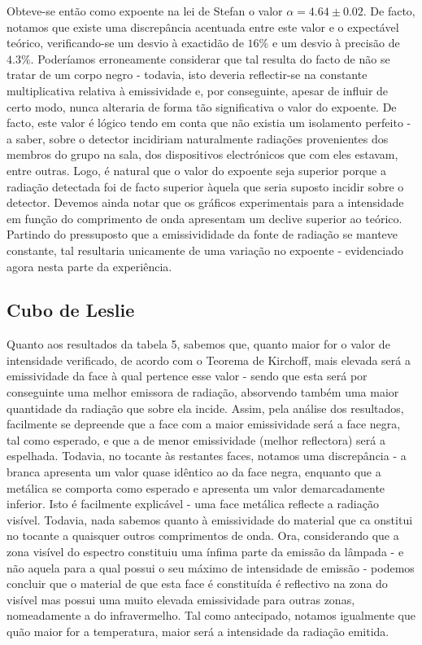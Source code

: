 \documentclass[9pt]{extarticle}
\begin{document}
\begin{multicols}{2}
\par Obteve-se então como expoente na lei de Stefan o valor $\alpha=4.64\pm0.02$. De facto, notamos que existe uma discrepância acentuada entre este valor e o expectável teórico, verificando-se um desvio à exactidão de $16\%$ e um desvio à precisão de $4.3\%$. Poderíamos erroneamente considerar que tal resulta do facto de não se tratar de um corpo negro - todavia, isto deveria reflectir-se na constante multiplicativa relativa à emissividade e, por conseguinte, apesar de influir de certo modo, nunca alteraria de forma tão significativa o valor do expoente. De facto, este valor é lógico tendo em conta que não existia um isolamento perfeito - a saber, sobre o detector incidiriam naturalmente radiações provenientes dos membros do grupo na sala, dos dispositivos electrónicos que com eles estavam, entre outras. Logo, é natural que o valor do expoente seja superior porque a radiação detectada foi de facto superior àquela que seria suposto incidir sobre o detector. Devemos ainda notar que os gráficos experimentais para a intensidade em função do comprimento de onda apresentam um declive superior ao teórico. Partindo do pressuposto que a emissivididade da fonte de radiação se manteve constante, tal resultaria unicamente de uma variação no expoente - evidenciado agora nesta parte da experiência.

\subsection{Cubo de Leslie}

\par Quanto aos resultados da tabela 5, sabemos que, quanto maior for o valor de intensidade verificado, de acordo com o Teorema de Kirchoff, mais elevada será a emissividade da face à qual pertence esse valor - sendo que esta será por conseguinte uma melhor emissora de radiação, absorvendo também uma maior quantidade da radiação que sobre ela incide. Assim, pela análise dos resultados, facilmente se depreende que a face com a maior emissividade será a face negra, tal como esperado, e que a de menor emissividade (melhor reflectora) será a espelhada. Todavia, no tocante  às restantes faces, notamos uma discrepância - a branca apresenta um valor quase idêntico ao da face negra, enquanto que a metálica se comporta como esperado e apresenta um valor demarcadamente inferior. Isto é facilmente explicável - uma face metálica reflecte a radiação visível. Todavia, nada sabemos quanto à emissividade do material que  ca onstitui no tocante a quaisquer outros comprimentos de onda. Ora, considerando que a zona visível do espectro constituiu uma ínfima parte da emissão da lâmpada - e não aquela para a qual possui o seu máximo de intensidade de emissão - podemos concluir que o material de que esta face é constituída é reflectivo na zona do visível mas possui uma muito elevada emissividade para outras zonas, nomeadamente a do infravermelho. Tal como antecipado, notamos igualmente que quão maior for a temperatura, maior será a intensidade da radiação emitida.


\end{multicols}
\end{document}

